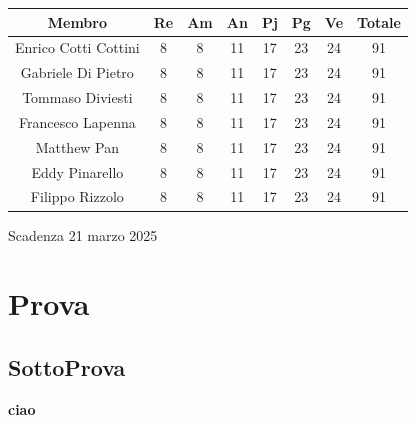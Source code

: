 \documentclass{article}
\begin{document}
\begin{table}[!h]
	\begin{center}
		\begin{tabular}{ |c|c|c|c|c|c|c|c| }
			\hline
			\textbf{Membro}    & \textbf{Re} & \textbf{Am} & \textbf{An} & \textbf{Pj} & \textbf{Pg} & \textbf{Ve} & \textbf{Totale} \\
			\hline
			Enrico Cotti Cottini     & 8           & 8           & 11          & 17          & 23          & 24          & 91              \\
			Gabriele Di Pietro       & 8           & 8           & 11          & 17          & 23          & 24          & 91              \\
			Tommaso Diviesti         & 8           & 8           & 11          & 17          & 23          & 24          & 91              \\
			Francesco Lapenna        & 8           & 8           & 11          & 17          & 23          & 24          & 91              \\
			Matthew Pan              & 8           & 8           & 11          & 17          & 23          & 24          & 91              \\
			Eddy Pinarello           & 8           & 8           & 11          & 17          & 23          & 24          & 91              \\
			Filippo Rizzolo          & 8           & 8           & 11          & 17          & 23          & 24          & 91              \\
			\hline
		\end{tabular}
	\end{center}
\end{table}

Scadenza 
21 marzo 2025

\section{Prova}
\subsection{SottoProva}
\textbf{ciao}
\end{document}
